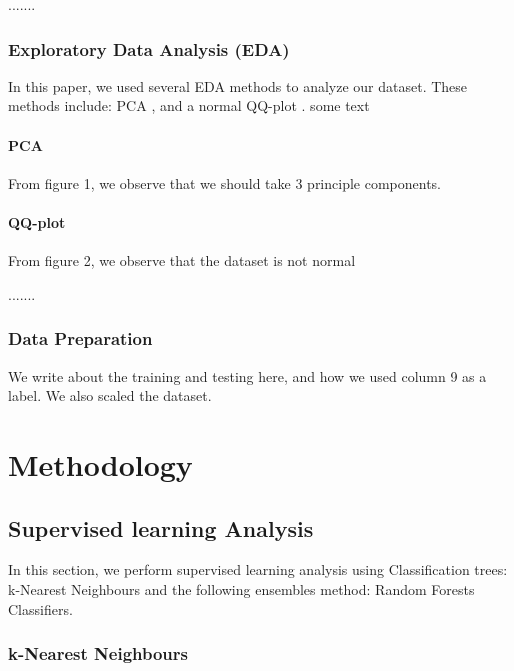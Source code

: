 \documentclass[12pt]{article}
\begin{document}
.......

\subsubsection{Exploratory Data Analysis (EDA)}
In this paper, we used several EDA methods to analyze our dataset. These methods include: PCA \cite{kurita2019principal}, and a normal QQ-plot \cite{marden2004positions}. some text \cite{Lecture2}
\paragraph{PCA}

From figure 1, we observe that we should take 3 principle components.



\paragraph{QQ-plot}

From figure 2, we observe that the dataset is not normal


.......
\subsubsection{Data Preparation} 

We write about the training and testing here, and how we used column 9 as a label. We also scaled the dataset.\\

\section{Methodology}
\subsection{Supervised learning Analysis} 
 In this section, we perform supervised learning analysis using Classification trees: k-Nearest Neighbours and the following ensembles method: Random Forests Classifiers.\cite{zhou2012ensemble}
 
 \subsubsection{k-Nearest Neighbours}
\end{document}
